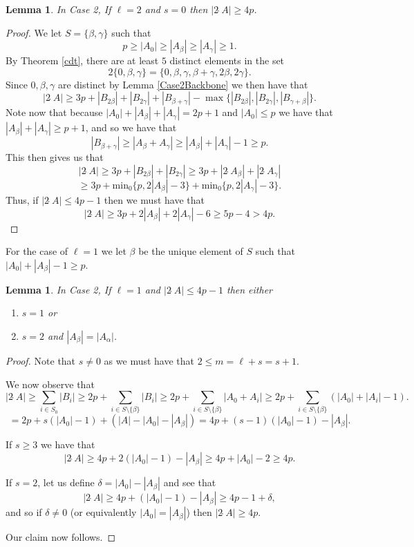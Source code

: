 \documentclass[a4paper, 12pt]{article}\usepackage[english]{babel}
\newtheorem{lem}[thm]{Lemma}
\newcommand{\minz}{\mathrm{min}_0}
\newcommand{\<}{\langle}
\begin{document}
\begin{lem}\label{Case2:L2S0}
    In Case 2, If $\ell=2$ and $s=0$ then $|2\hat{\;}A|\geq 4p$.
\end{lem}
\begin{proof}
    We let $S=\{\beta,\gamma\}$ such that \[p\geq |A_0|\geq |A_\beta|\geq |A_\gamma|\geq 1.\] By Theorem \ref{cdt}, there are at least $5$ distinct elements in the set \[2\{0,\beta,\gamma\}=\{0,\beta,\gamma,\beta+\gamma,2\beta,2\gamma\}.\] Since $0,\beta,\gamma$ are distinct by Lemma \ref{Case2Backbone} we then have that \[|2\hat{\;}A|\geq 3p+|B_{2\beta}|+|B_{2\gamma}|+|B_{\beta+\gamma}|-\max\{|B_{2\beta}|,|B_{2\gamma}|,|B_{\gamma+\beta}|\}.\] 
Note now that because $|A_0|+|A_\beta|+|A_\gamma|=2p+1$ and $|A_0|\leq p$ we have that $|A_\beta|+|A_\gamma|\geq p+1$, and so we have that \[|B_{\beta+\gamma}|\geq |A_{\beta}+A_\gamma|\geq |A_\beta|+|A_\gamma|-1\geq p.\] This then gives us that \[|2\hat{\;}A|\geq 3p+|B_{2\beta}|+|B_{2\gamma}|\geq 3p+|2\hat{\;}A_\beta|+|2\hat{\;}A_\gamma|\]
\[\geq 3p+\minz\{p,2|A_\beta|-3\}+\minz\{p,2|A_\gamma|-3\}.\] Thus, if $|2\hat{\;}A|\leq 4p-1$ then we must have that \[|2\hat{\;}A|\geq 3p+2|A_\beta|+2|A_\gamma|-6\geq 5p-4> 4p. \]
\end{proof}
For the case of $\ell=1$ we let $\beta$ be the unique element of $S$ such that $|A_0|+|A_\beta|-1\geq p$.
\begin{lem}
\label{Case2:L1reduce}
   In Case 2, If $\ell =1$ and $|2\hat{\;}A|\leq 4p-1$ then either 
    \begin{enumerate}
        \item $s=1$ or
        \item $s=2$ and $|A_\beta|=|A_\alpha|$. 
    \end{enumerate}
\end{lem}
\begin{proof}Note that $s\neq 0$ as we must have that $2\leq m=\ell+s=s+1$.

    We now observe that \[|2\hat{\;}A|\geq \sum_{i\in S_0}|B_i|\geq 2p+\sum_{i\in S\setminus\{\beta\}}|B_i|\geq 2p+\sum_{i\in S\setminus\{\beta\}}|A_0+A_i|\geq 2p+\sum_{i\in S\setminus\{\beta\}}(|A_0|+|A_i|-1).\]
    \[=2p+s(|A_0|-1)+(|A|-|A_0|-|A_\beta|)=4p+(s-1)(|A_0|-1)-|A_\beta|.\] 

    If $s\geq 3$ we have that \[|2\hat{\;}A|\geq 4p+2(|A_0|-1)-|A_\beta|\geq 4p+ |A_0|-2\geq 4p.\]

    If $s=2$, let us define $\delta=|A_0|-|A_\beta|$ and see that \[|2\hat{\;}A|\geq 4p+(|A_0|-1)-|A_\beta|\geq 4p-1+\delta,\] and so if $\delta\neq 0$ (or equivalently $|A_0|=|A_\beta|$) then $|2\hat{\;}A|\geq 4p$.

    Our claim now follows.
\end{proof}
\end{document}
